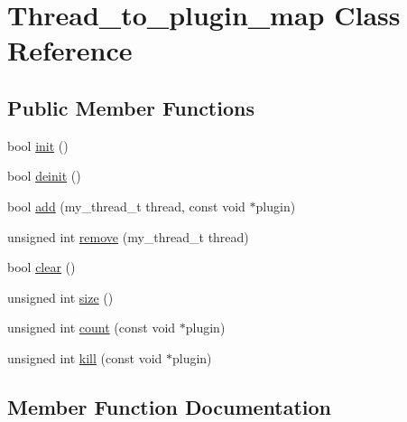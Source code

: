\hypertarget{classThread__to__plugin__map}{}\section{Thread\+\_\+to\+\_\+plugin\+\_\+map Class Reference}
\label{classThread__to__plugin__map}
\subsection*{Public Member Functions}
\begin{DoxyCompactItemize}
\item 
bool \mbox{\hyperlink{classThread__to__plugin__map_ad5ad833c4c25b30f299108c5a10da632}{init}} ()
\item 
bool \mbox{\hyperlink{classThread__to__plugin__map_a4cea7a05e63e700584bf305dc28aaa2c}{deinit}} ()
\item 
bool \mbox{\hyperlink{classThread__to__plugin__map_a75f7af73079c1d725fd501035ac5902e}{add}} (my\+\_\+thread\+\_\+t thread, const void $\ast$plugin)
\item 
unsigned int \mbox{\hyperlink{classThread__to__plugin__map_aedea66a850c6c690e95c56b9e305dd63}{remove}} (my\+\_\+thread\+\_\+t thread)
\item 
bool \mbox{\hyperlink{classThread__to__plugin__map_a6f1775e4723f2b68eecc1f347dce506a}{clear}} ()
\item 
unsigned int \mbox{\hyperlink{classThread__to__plugin__map_af09cfc90c390b4e58386f0ea2ae18d50}{size}} ()
\item 
unsigned int \mbox{\hyperlink{classThread__to__plugin__map_ad58c72ec47a7a136e4ff4a6281581259}{count}} (const void $\ast$plugin)
\item 
unsigned int \mbox{\hyperlink{classThread__to__plugin__map_a90bd103e25c4a006a672f64dbaa08c2c}{kill}} (const void $\ast$plugin)
\end{DoxyCompactItemize}


\subsection{Member Function Documentation}
\mbox{\label{classThread__to__plugin__map_a75f7af73079c1d725fd501035ac5902e}} 
